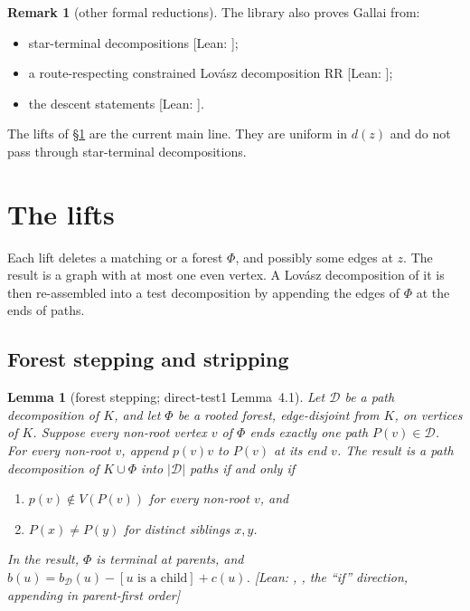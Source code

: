 \documentclass[11pt]{amsart}
\newtheorem{lemma}[theorem]{Lemma}
\theoremstyle{definition}
\newtheorem{remark}[theorem]{Remark}
\newcommand{\st}[1]{\textsf{\small[#1]}}
\newcommand{\cD}{\mathcal D}
\begin{document}
\begin{remark}[other formal reductions]\label{rem:other}
The library also proves Gallai from:
\begin{itemize}[leftmargin=*]
\item star-terminal decompositions \st{Lean: };
\item a route-respecting constrained Lov\'asz decomposition RR \st{Lean: };
\item the descent statements  \st{Lean: }.
\end{itemize}
The lifts of \S\ref{sec:lifts} are the current main line. They are uniform in $d(z)$ and do not pass
through star-terminal decompositions.
\end{remark}

\section{The lifts}\label{sec:lifts}

Each lift deletes a matching or a forest $\Phi$, and possibly some edges at $z$. The result is a graph
with at most one even vertex. A Lov\'asz decomposition of it is then re-assembled into a test
decomposition by appending the edges of $\Phi$ at the ends of paths.

\subsection{Forest stepping and stripping}

\begin{lemma}[forest stepping; direct-test1 Lemma~4.1]\label{lem:step}
Let $\cD$ be a path decomposition of $K$, and let $\Phi$ be a rooted forest, edge-disjoint from $K$,
on vertices of $K$. Suppose every non-root vertex $v$ of $\Phi$ ends exactly one path $P(v)\in\cD$.
For every non-root $v$, append $p(v)v$ to $P(v)$ at its end $v$. The result is a path decomposition of
$K\cup\Phi$ into $|\cD|$ paths if and only if
\begin{enumerate}[label=(\roman*)]
\item $p(v)\notin V(P(v))$ for every non-root $v$, and
\item $P(x)\ne P(y)$ for distinct siblings $x,y$.
\end{enumerate}
In the result, $\Phi$ is terminal at parents, and $b(u)=b_\cD(u)-[u\text{ is a child}]+c(u)$.
\st{Lean: , , the ``if'' direction, appending in
parent-first order}
\end{lemma}
\end{document}
